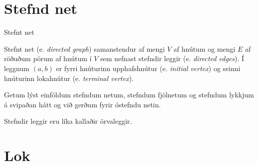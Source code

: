 \documentclass{beamer}
\begin{document}












\section{Stefnd net}

\begin{frame}{Stefnt net}
	\begin{tcolorbox}[title=Stefnt net]
		Stefnt net (e. \emph{directed graph}) samanstendur af mengi $V$ af hnútum og mengi $E$ af röðuðum pörum af hnútum í $V$ sem nefnast stefndir leggir (e. \emph{directed edges}). Í leggnum $(a, b)$ er fyrri hnúturinn upphafshnútur (e. \emph{initial vertex}) og seinni hnúturinn lokahnútur (e. \emph{terminal vertex}).
	\end{tcolorbox}

	Getum lýst einföldum stefndum netum, stefndum fjölnetum og stefndum lykkjum á svipaðan hátt og við gerðum fyrir óstefndu netin.

	Stefndir leggir eru líka kallaðir örvaleggir.
\end{frame}







\section{Lok}
\end{document}
